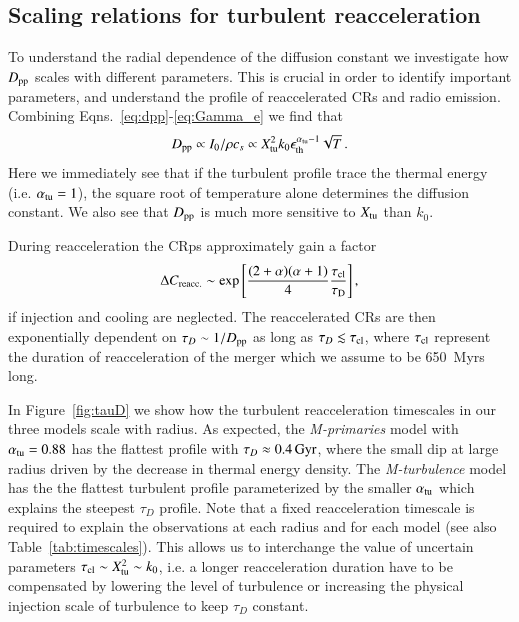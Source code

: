 \documentclass[fleqn,usenatbib,useAMS]{mnras}
\newcommand{\Mflatturb}{{\it M-turbulence}\xspace}
\newcommand{\Mprimary}{{\it M-primaries}\xspace}
\begin{document}
\subsection{Scaling relations for turbulent reacceleration}
To understand the radial dependence of the diffusion constant we
investigate how $D_{\mathrm{pp}}$ scales with different parameters. This is
crucial in order to identify important parameters, and understand the
profile of reaccelerated CRs and radio emission. Combining
Eqns.~\ref{eq:dpp}-\ref{eq:Gamma_e} we find that 
\begin{equation}
  \label{eq:Dpp_scaling}
  D_{\mathrm{pp}}\propto I_0/\rho c_s \propto 
X_{\mathrm{tu}}^2k_0\epsilon_{\mathrm{th}}^{\alpha_{\mathrm{tu}}-1}\sqrt{T}\,.
\end{equation}
Here we immediately see that if the turbulent profile trace the
thermal energy (i.e. $\alpha_{\mathrm{tu}}=1$), the square root of
temperature alone determines the diffusion constant. We also see that
$D_{\mathrm{pp}}$ is much more sensitive to $X_{\mathrm{tu}}$ than $k_0$.

During reacceleration the CRps approximately gain a factor 
\begin{equation}
  \label{eq:Creacc}
  \Delta C_{\mathrm{reacc.}} \sim
  \exp{\left[\frac{(2+\alpha)(\alpha+1)}{4}\frac{\tau_{\mathrm{cl}}}{\tau_{\mathrm{D}}}\right]}\,,
\end{equation}
if injection and cooling are neglected. The reaccelerated CRs are then
exponentially dependent on $\tau_D\sim 1/D_{\mathrm{pp}}$ as long as $\tau_D
\lesssim \tau_{\mathrm{cl}}$, where $\tau_{\mathrm{cl}}$ represent the duration
of reacceleration of the merger which we assume to be 650~Myrs long.

In Figure~\ref{fig:tauD} we show how the turbulent reacceleration
timescales in our three models scale with radius. As expected, the
\Mprimary model with $\alpha_{\mathrm{tu}}=0.88$ has the flattest profile
with $\tau_D\approx0.4\,{\mathrm{Gyr}}$, where the small dip at large
radius driven by the decrease in thermal energy density. The
\Mflatturb model has the the flattest turbulent profile parameterized
by the smaller $\alpha_{\mathrm{tu}}$ which explains the steepest $\tau_D$
profile. Note that a fixed reacceleration timescale is required to
explain the observations at each radius and for each model (see also
Table~\ref{tab:timescales}). This allows us to interchange the value
of uncertain parameters $\tau_{\mathrm{cl}} \sim X_{\mathrm{tu}}^2 \sim k_0$,
i.e. a longer reacceleration duration have to be compensated by
lowering the level of turbulence or increasing the physical injection
scale of turbulence to keep $\tau_D$ constant.
\end{document}
